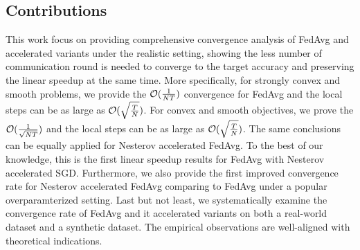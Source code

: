 \subsection{Contributions}
This work focus on providing comprehensive convergence analysis
of FedAvg and accelerated variants under the realistic setting, showing
the less number of communication round is needed to converge to the
target accuracy and preserving the linear speedup at the same time.
More specifically, for strongly convex and smooth problems, we provide the {\small{${\mathcal{O}}(\frac{1}{NT})$}} convergence  for FedAvg and the local steps can be as large as {\small{${\mathcal{O}}(\sqrt{\frac{T}{N}})$}}. For convex and smooth objectives, we prove the {\small{${\mathcal{O}}(\frac{1}{\sqrt{NT}})$}} and the local steps can be as large as {\small{${\mathcal{O}}(\sqrt{\frac{T}{N}})$}}. The same conclusions can be equally applied for Nesterov accelerated FedAvg. To the best of our knowledge, this is the first linear speedup results for FedAvg with Nesterov accelerated SGD. Furthermore, 
we also provide the first improved convergence rate for Nesterov accelerated FedAvg comparing to FedAvg under a popular overparamterized setting. 
Last but not least, we systematically examine the convergence rate of
FedAvg and it accelerated variants on both a real-world dataset and a synthetic dataset. The empirical observations are well-aligned with theoretical indications.








